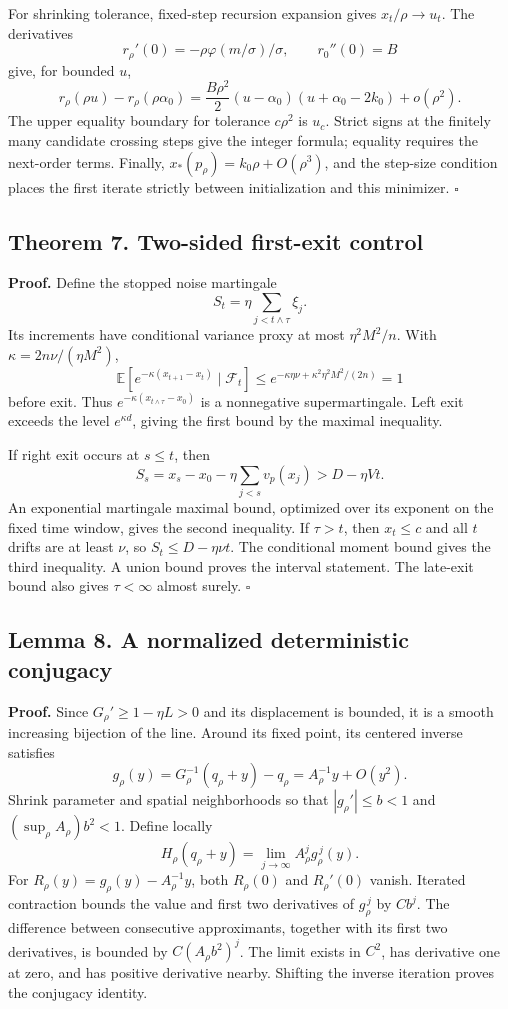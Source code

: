 For shrinking tolerance, fixed-step recursion expansion gives
\(x_t/\rho\to u_t\). The derivatives \[
r_\rho'(0)=-\rho\varphi(m/\sigma)/\sigma,\qquad r_0''(0)=B
\] give, for bounded \(u\), \[
r_\rho(\rho u)-r_\rho(\rho\alpha_0)
=\frac{B\rho^2}{2}(u-\alpha_0)(u+\alpha_0-2k_0)+o(\rho^2).
\] The upper equality boundary for tolerance \(c\rho^2\) is \(u_c\).
Strict signs at the finitely many candidate crossing steps give the
integer formula; equality requires the next-order terms. Finally,
\(x_*(p_\rho)=k_0\rho+O(\rho^3)\), and the step-size condition places
the first iterate strictly between initialization and this minimizer.
\(\square\)

\subsection{Theorem 7. Two-sided first-exit
control}\label{gaussian_proofs-theorem-7.-two-sided-first-exit-control}

\textbf{Proof.} Define the stopped noise martingale \[
S_t=\eta\sum_{j<t\wedge\tau}\xi_j.
\] Its increments have conditional variance proxy at most
\(\eta^2M^2/n\). With \(\kappa=2n\nu/(\eta M^2)\), \[
\mathbb E[e^{-\kappa(x_{t+1}-x_t)}\mid\mathcal F_t]
\le e^{-\kappa\eta\nu+\kappa^2\eta^2M^2/(2n)}=1
\] before exit. Thus \(e^{-\kappa(x_{t\wedge\tau}-x_0)}\) is a
nonnegative supermartingale. Left exit exceeds the level
\(e^{\kappa d}\), giving the first bound by the maximal inequality.

If right exit occurs at \(s\le t\), then \[
S_s=x_s-x_0-\eta\sum_{j<s}v_p(x_j)>D-\eta Vt.
\] An exponential martingale maximal bound, optimized over its exponent
on the fixed time window, gives the second inequality. If \(\tau>t\),
then \(x_t\le c\) and all \(t\) drifts are at least \(\nu\), so
\(S_t\le D-\eta\nu t\). The conditional moment bound gives the third
inequality. A union bound proves the interval statement. The late-exit
bound also gives \(\tau<\infty\) almost surely. \(\square\)

\subsection{Lemma 8. A normalized deterministic
conjugacy}\label{gaussian_proofs-lemma-8.-a-normalized-deterministic-conjugacy}

\textbf{Proof.} Since \(G_\rho'\ge1-\eta L>0\) and its displacement is
bounded, it is a smooth increasing bijection of the line. Around its
fixed point, its centered inverse satisfies \[
g_\rho(y)=G_\rho^{-1}(q_\rho+y)-q_\rho
=A_\rho^{-1}y+O(y^2).
\] Shrink parameter and spatial neighborhoods so that
\(|g_\rho'|\le b<1\) and \((\sup_\rho A_\rho)b^2<1\). Define locally \[
H_\rho(q_\rho+y)=\lim_{j\to\infty}A_\rho^j g_\rho^{\,j}(y).
\] For \(R_\rho(y)=g_\rho(y)-A_\rho^{-1}y\), both \(R_\rho(0)\) and
\(R_\rho'(0)\) vanish. Iterated contraction bounds the value and first
two derivatives of \(g_\rho^{\,j}\) by \(Cb^j\). The difference between
consecutive approximants, together with its first two derivatives, is
bounded by \(C(A_\rho b^2)^j\). The limit exists in \(C^2\), has
derivative one at zero, and has positive derivative nearby. Shifting the
inverse iteration proves the conjugacy identity.

